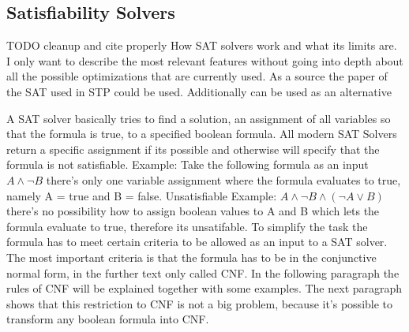 \subsection{Satisfiability Solvers}
TODO cleanup and cite properly
How SAT solvers work and what its limits are.
I only want to describe the most relevant features without going into depth about all the possible optimizations that are currently used.
As a source the paper of the SAT used in STP \cite{10.1007/978-3-540-24605-3_37} could be used. Additionally \cite{Gomes2008SatisfiabilityS} can be used as an alternative

A SAT solver basically tries to find a solution, an assignment of all variables so that the formula is true, to a specified boolean formula. All modern SAT Solvers return a specific assignment if its possible and otherwise will specify that the formula is not satisfiable.
Example: Take the following formula as an input $A \land \lnot B$ there's only one variable assignment where the formula evaluates to true, namely A = true and B = false.
Unsatisfiable Example: $A \land \lnot B \land (\lnot A \lor B)$ there's no possibility how to assign boolean values to A and B which lets the formula evaluate to true, therefore its unsatifable.
To simplify the task the formula has to meet certain criteria to be allowed as an input to a SAT solver. The most important criteria is that the formula has to be in the conjunctive normal form, in the further text only called CNF. In the following paragraph the rules of CNF will be explained together with some examples. The next paragraph shows that this restriction to CNF is not a big problem, because it's possible to transform any boolean formula into CNF\cite{Jackson:2004:CFC:2103144.2103160}.\\
